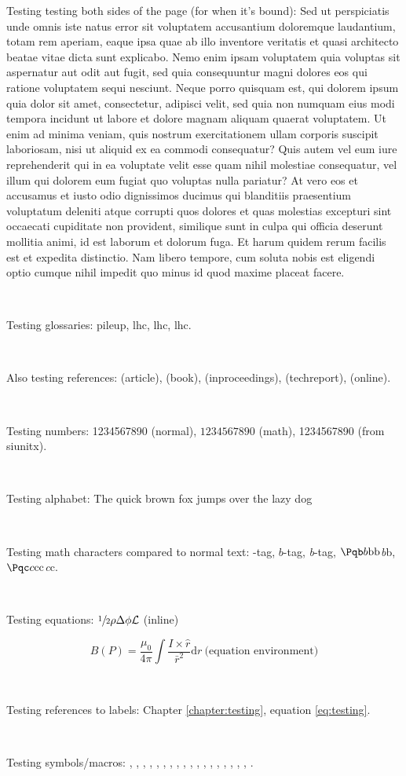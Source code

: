 Testing testing both sides of the page (for when it's bound): Sed ut perspiciatis unde omnis iste natus error sit voluptatem accusantium doloremque laudantium, totam rem aperiam, eaque ipsa quae ab illo inventore veritatis et quasi architecto beatae vitae dicta sunt explicabo. Nemo enim ipsam voluptatem quia voluptas sit aspernatur aut odit aut fugit, sed quia consequuntur magni dolores eos qui ratione voluptatem sequi nesciunt. Neque porro quisquam est, qui dolorem ipsum quia dolor sit amet, consectetur, adipisci velit, sed quia non numquam eius modi tempora incidunt ut labore et dolore magnam aliquam quaerat voluptatem. Ut enim ad minima veniam, quis nostrum exercitationem ullam corporis suscipit laboriosam, nisi ut aliquid ex ea commodi consequatur? Quis autem vel eum iure reprehenderit qui in ea voluptate velit esse quam nihil molestiae consequatur, vel illum qui dolorem eum fugiat quo voluptas nulla pariatur? At vero eos et accusamus et iusto odio dignissimos ducimus qui blanditiis praesentium voluptatum deleniti atque corrupti quos dolores et quas molestias excepturi sint occaecati cupiditate non provident, similique sunt in culpa qui officia deserunt mollitia animi, id est laborum et dolorum fuga. Et harum quidem rerum facilis est et expedita distinctio. Nam libero tempore, cum soluta nobis est eligendi optio cumque nihil impedit quo minus id quod maxime placeat facere.

\

Testing glossaries: \gls{pileup}, \acrlong{lhc}, \acrshort{lhc}, \acrfull{lhc}.

\

Also testing references: \cite{CMS-PAPER-SUS-15-005-published} (article), \cite{tagkey1984quarksandleptons} (book), \cite{Lisanti:2016jxe} (inproceedings), \cite{CMS-PAS-HIG-18-008} (techreport), \cite{cmslumitwikipage} (online).

\

Testing numbers: 1234567890 (normal), $1234567890$ (math), \si{1234567890} (from siunitx).

\

Testing alphabet: The quick brown fox jumps over the lazy dog

\

Testing math characters compared to normal text: \Pqb-tag, $b$-tag, \emph{b}-tag, $\Pqb b \mathrm{b} \text{b}$\emph{b}b, $\Pqc c \mathrm{c} \text{c}$\emph{c}c.

\

Testing equations: $\sfrac{1}{2} \rho \Delta \phi \mathcal{L}$ (inline)

\begin{equation}
B(P) = \frac{\mu_0}{4\pi} \int \frac{I \times \hat{r}}{\bar{r}^2}\mathrm{d}r \ \text{(equation environment)}
\label{eq:testing}
\end{equation}

\

Testing references to labels: Chapter \ref{chapter:testing}, equation \ref{eq:testing}.

\

Testing symbols/macros: \eV, \MeV, \GeV, \TeV, \pt, \ptmiss, \met, \HT, \mht, \mt, \aDark, \rinv, \mqdark, \doubleMuCr, \doubleLepMass, \alphat, \ttbarpjets, \wtolnupjets, \LSP.
